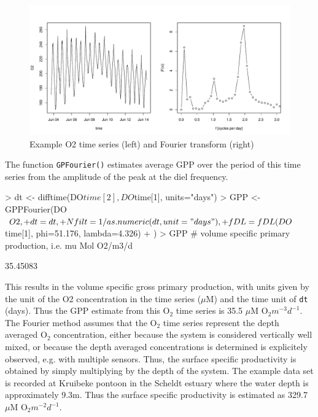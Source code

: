 \documentclass[10pt,a4wide]{article}
\newcommand{\Ox}{\mathrm{O_2}}
\begin{document}
\begin{Schunk}
\end{Schunk}

\begin{figure}[t]
\begin{center}
\includegraphics{GPPFourier-GPPFourierFig1}
\end{center}
\caption{Example O2 time series (left) and Fourier transform (right)} 
\label{Fig1}
\end{figure}

The function \texttt{GPFourier()} estimates average GPP over the period of this time series from the amplitude of the peak at the diel frequency. 

\begin{Schunk}
\begin{Sinput}
> dt <- difftime(DO$time[2], DO$time[1], units="days")
> GPP <- GPPFourier(DO$O2, 
+ 	dt=dt, 
+ 	Nfilt=1/as.numeric(dt, unit="days"), 
+ 	fDL=fDL(DO$time[1], phi=51.176, lambda=4.326)
+ )
> GPP # volume specific primary production, i.e. mu Mol O2/m3/d
\end{Sinput}
\begin{Soutput}
[1] 35.45083
\end{Soutput}
\end{Schunk}
This results in the volume specific gross primary production, with units given by the unit of the O2 concentration in the time series ($\mu$M) and the time unit of \texttt{dt} (days). Thus the GPP estimate from this $\Ox$ time series is 35.5 $\mu$M $\Ox$$m^{-3}d^{-1}$. The Fourier method assumes that the $\Ox$ time series represent the depth averaged $\Ox$ concentration, either because the system is considered vertically well mixed, or because the depth averaged concentrations is determined is explicitely observed, e.g. with multiple sensors. Thus, the surface specific productivity is obtained by simply multiplying by the depth of the system. The example data set is recorded at Kruibeke pontoon in the Scheldt estuary where the water depth is approximately 9.3m. Thus the surface specific productivity is estimated as 329.7 $\mu$M $\Ox$$m^{-2}d^{-1}$.
\end{document}
